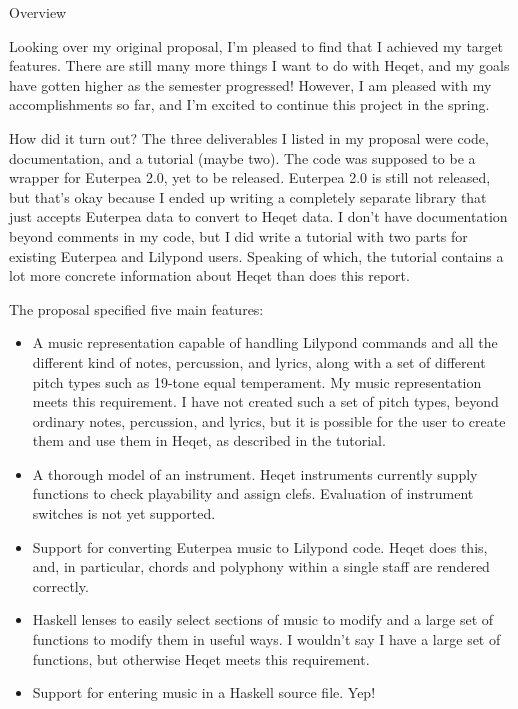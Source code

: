 \documentclass{article}
\begin{document}
\begin{section}{Overview}

Looking over my original proposal, I'm pleased to find that I  achieved my target features. There are still many more things I want to do with Heqet, and my goals have gotten higher as the semester progressed! However, I am pleased with my accomplishments so far, and I'm excited to continue this project in the spring. 

\end{section}
\begin{section}{How did it turn out?}
The three deliverables I listed in my proposal were code, documentation, and a tutorial (maybe two). The code was supposed to be a wrapper for Euterpea 2.0, yet to be released. Euterpea 2.0 is still not released, but that's okay because I ended up writing a completely separate library that just accepts Euterpea data to convert to Heqet data. I don't have documentation beyond comments in my code, but I did write a tutorial with two parts for existing Euterpea and Lilypond users. Speaking of which, the tutorial contains a lot more concrete information about Heqet than does this report.

The proposal specified five main features:
\begin{itemize}
\item A music representation capable of handling Lilypond commands and all the different kind of notes, percussion, and lyrics, along with a set of different pitch types such as 19-tone equal temperament. My music representation meets this requirement. I have not created such a set of pitch types, beyond ordinary notes, percussion, and lyrics, but it is possible for the user to create them and use them in Heqet, as described in the tutorial.

\item A thorough model of an instrument. Heqet instruments currently supply functions to check playability and assign clefs. Evaluation of instrument switches is not yet supported.

\item Support for converting Euterpea music to Lilypond code. Heqet does this, and, in particular, chords and polyphony within a single staff are rendered correctly.

\item Haskell lenses to easily select sections of music to modify and a large set of functions to modify them in useful ways. I wouldn't say I have a large set of functions, but otherwise Heqet meets this requirement.

\item Support for entering music in a Haskell source file. Yep!

\end{itemize}

\end{section}
\end{document}
